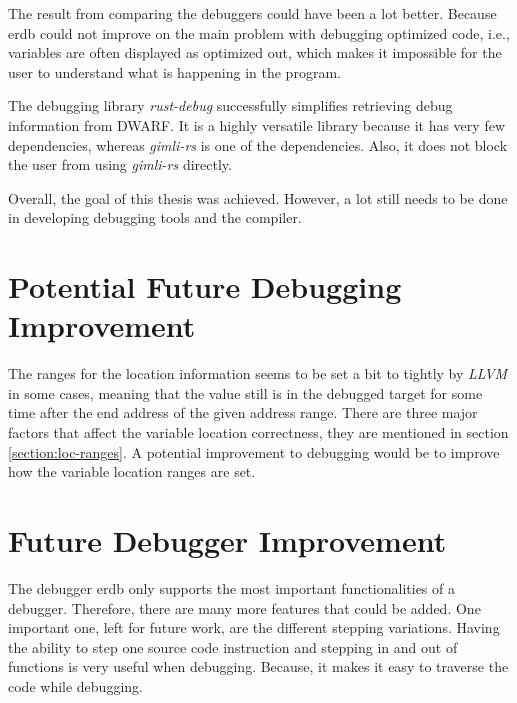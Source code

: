 


The result from comparing the debuggers could have been a lot better.
Because \gls{erdb} could not improve on the main problem with debugging optimized code, i.e., variables are often displayed as optimized out, which makes it impossible for the user to understand what is happening in the program.


The debugging library \emph{rust-debug} successfully simplifies retrieving debug information from \gls{DWARF}.
It is a highly versatile library because it has very few dependencies, whereas \emph{gimli-rs} is one of the dependencies.
Also, it does not block the user from using \emph{gimli-rs} directly.


Overall, the goal of this thesis was achieved.
However, a lot still needs to be done in developing debugging tools and the compiler.



\section{Potential Future Debugging Improvement}
The ranges for the location information seems to be set a bit to tightly by \emph{LLVM} in some cases, meaning that the value still is in the debugged target for some time after the end address of the given address range.
There are three major factors that affect the variable location correctness, they are mentioned in section \ref{section:loc-ranges}.
A potential improvement to debugging would be to improve how the variable location ranges are set.


\section{Future Debugger Improvement}
The debugger \gls{erdb} only supports the most important functionalities of a debugger.
Therefore, there are many more features that could be added.
One important one, left for future work, are the different stepping variations.
Having the ability to step one source code instruction and stepping in and out of functions is very useful when debugging.
Because, it makes it easy to traverse the code while debugging.


